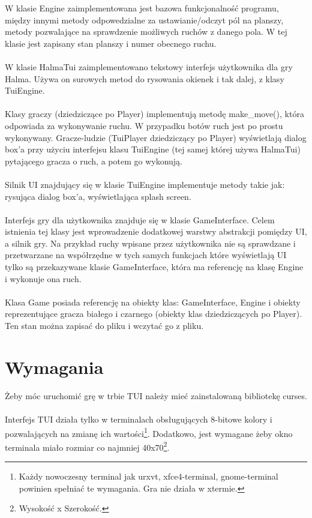 \documentclass[12pt, titlepage]{article}
\begin{document}
\noindent
W klasie Engine zaimplementowana jest bazowa
funkcjonalność programu, między innymi metody
odpowedzialne za ustawianie/odczyt pól na planszy,
metody pozwalające na sprawdzenie możliwych ruchów
z danego pola. W tej klasie jest zapisany stan planszy
i numer obecnego ruchu.
\\~\\
W klasie HalmaTui zaimplementowano tekstowy interfejs
użytkownika dla gry Halma. Używa on surowych metod do
rysowania okienek i tak dalej, z klasy TuiEngine.
\\~\\
Klasy graczy (dziedziczące po Player) implementują metodę
make\_move(), która odpowiada za wykonywanie ruchu. W
przypadku botów ruch jest po prostu wykonywany. Gracze-ludzie
(TuiPlayer dziedziczący po Player) wyświetlają dialog box'a
przy użyciu interfejsu klasu TuiEngine (tej samej której używa
HalmaTui) pytającego gracza o ruch, a potem go wykonują.
\\~\\
Silnik UI znajdujący się w klasie TuiEngine implementuje metody
takie jak: rysująca dialog box'a, wyświetlająca splash screen.
\\~\\
Interfejs gry dla użytkownika znajduje się w klasie GameInterface.
Celem istnienia tej klasy jest wprowadzenie dodatkowej warstwy
abstrakcji pomiędzy UI, a silnik gry. Na przykład ruchy wpisane
przez użytkownika nie są sprawdzane i przetwarzane na współrzędne
w tych samych funkcjach które wyświetlają UI tylko są przekazywane
klasie GameInterface, która ma referencję na klasę Engine i wykonuje
ona ruch.
\\~\\
Klasa Game posiada referencję na obiekty klas: GameInterface, Engine i
obiekty reprezentujące gracza białego i czarnego (obiekty klas
dziedziczących po Player). Ten stan można zapisać do pliku i wczytać
go z pliku.

\pagebreak
\section{Wymagania}
Żeby móc uruchomić grę w trbie TUI należy mieć zainstalowaną
bibliotekę curses.
\\~\\
Interfejs TUI działa tylko w terminalach obsługujących 8-bitowe
kolory i pozwalających na zmianę ich wartości\footnote{Każdy nowoczesny terminal jak urxvt, xfce4-terminal, gnome-terminal powinien spełniać te wymagania. Gra nie działa w xtermie.}.
Dodatkowo, jest wymagane żeby okno terminala miało rozmiar co
najmniej 40x70\footnote{Wysokość x Szerokość.}.
\end{document}
